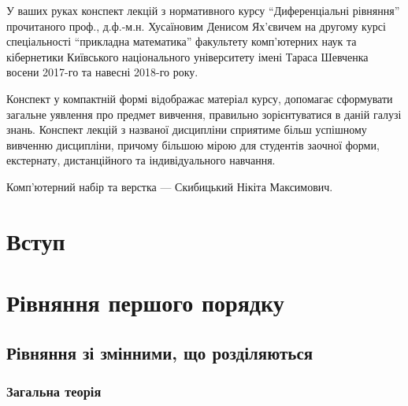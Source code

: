 




\maketitle \thispagestyle{empty} \newpage 

У ваших руках конспект лекцій з нормативного курсу ``Диференціальні рівняння'' прочитаного проф., д.ф.-м.н. Хусаїновим Денисом Ях'євичем на другому курсі спеціальності ``прикладна математика'' факультету ком\-п'ю\-тер\-них наук та кібернетики Київського національного університету імені Тараса Шевченка восени 2017-го та навесні 2018-го року. \parvskip

Конспект у компактній формі відображає матеріал курсу, допомагає сформувати загальне уявлення про предмет вивчення, правильно зорієнтуватися в даній галузі знань. Конспект лекцій з названої дисципліни сприятиме більш успішному вивченню дисципліни, причому більшою мірою для студентів заочної форми, екстернату, дистанційного та індивідуального навчання. \parvskip

Комп'ютерний набір та верстка --- Скибицький Нікіта Максимович. \newpage

\tableofcontents \newpage

\section*{Вступ}


\section{Рівняння першого порядку}


	\subsection{Рівняння зі змінними, що розділяються}
	

		\subsubsection{Загальна теорія}
		

